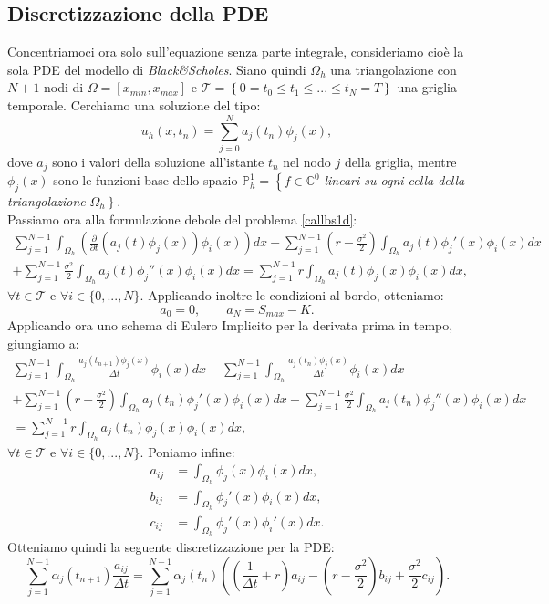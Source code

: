 \documentclass[a4paper,10pt]{report}
\theoremstyle{plain}
\theoremstyle{definition}
\theoremstyle{remark}
\begin{document}
\subsection{Discretizzazione della PDE}
Concentriamoci ora solo sull'equazione senza parte integrale, consideriamo cio\`e la sola PDE del modello di \emph{Black\&Scholes}. Siano quindi $\Omega_h$ una triangolazione con $N+1$ nodi di $\Omega=[x_{min},x_{max}]$ e $\mathcal{T}=\left\{0= t_0\leq t_1\leq ... \leq t_N=T\right\}$ una griglia temporale. Cerchiamo una soluzione del tipo: $$u_h(x,t_n)=\sum_{j=0}^{N}a_j(t_n)\phi_j(x),$$ dove $a_j$ sono i valori della soluzione all'istante $t_n$ nel nodo $j$ della griglia, mentre $\phi_j(x)$ sono le funzioni base dello spazio $\mathbb{P}_h^1=\left\{f\in\mathbb{C}^0\right.$ \emph{lineari su ogni cella della triangolazione} $\Omega_h\left.\right\}$.\\Passiamo ora alla formulazione debole del problema \ref{callbs1d}:
\begin{multline}
\sum_{j=1}^{N-1}\int_{\Omega_h}\left(\frac{\partial}{\partial t}(a_j(t)\phi_j(x))\phi_i(x)\right)dx+\sum_{j=1}^{N-1}\left(r-\frac{\sigma^2}{2}\right)\int_{\Omega_h}a_j(t)\phi_j'(x)\phi_i(x)dx\\
+\sum_{j=1}^{N-1}\frac{\sigma^2}{2}\int_{\Omega_h}a_j(t)\phi_j''(x)\phi_i(x)dx=\sum_{j=1}^{N-1}r\int_{\Omega_h}a_j(t)\phi_j(x)\phi_i(x)dx,
\end{multline}
$\forall t\in\mathcal{T}$ e $\forall i\in\{0,...,N\}$. Applicando inoltre le condizioni al bordo, otteniamo: $$a_0=0, \qquad a_N=S_{max}-K.$$
Applicando ora uno schema di Eulero Implicito per la derivata prima in tempo, giungiamo a:
\begin{multline}
\sum_{j=1}^{N-1}\int_{\Omega_h}\frac{a_j(t_{n+1})\phi_j(x)}{\Delta t}\phi_i(x)dx-\sum_{j=1}^{N-1}\int_{\Omega_h}\frac{a_j(t_n)\phi_j(x)}{\Delta t}\phi_i(x)dx\\
+\sum_{j=1}^{N-1}\left(r-\frac{\sigma^2}{2}\right)\int_{\Omega_h}a_j(t_n)\phi_j'(x)\phi_i(x)dx+\sum_{j=1}^{N-1}\frac{\sigma^2}{2}\int_{\Omega_h}a_j(t_n)\phi_j''(x)\phi_i(x)dx\\
=\sum_{j=1}^{N-1}r\int_{\Omega_h}a_j(t_n)\phi_j(x)\phi_i(x)dx,
\end{multline}
$\forall t\in\mathcal{T}$ e $\forall i\in\{0,...,N\}$. Poniamo infine:
\begin{align*}
a_{ij}&=\int_{\Omega_h}\phi_j(x)\phi_i(x)dx,\\
b_{ij}&=\int_{\Omega_h}\phi_j'(x)\phi_i(x)dx,\\
c_{ij}&=\int_{\Omega_h}\phi_j'(x)\phi_i'(x)dx.
\end{align*}
Otteniamo quindi la seguente discretizzazione per la PDE:$$\sum_{j=1}^{N-1}\alpha_j(t_{n+1})\frac{a_{ij}}{\Delta t}=\sum_{j=1}^{N-1}\alpha_j(t_{n})\left(\left(\frac{1}{\Delta t}+r\right)a_{ij}-\left(r-\frac{\sigma^2}{2}\right)b_{ij}+\frac{\sigma^2}{2}c_{ij}\right).$$
\end{document}
